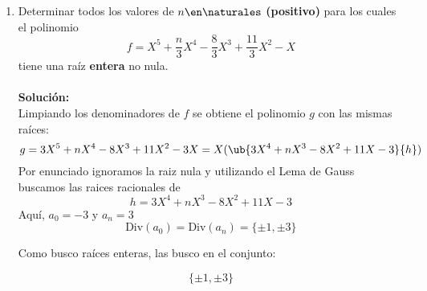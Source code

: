 \ejercicio
\begin{enumerate}[label=\alph*)]
\item
Determinar todos los valores de $n\en\naturales$ \textbf{(positivo)} para los cuales el polinomio
$$
f=X^5 + \frac{n}{3}X^4 - \frac{8}{3}X^3 + \frac{11}{3}X^2 - X
$$
tiene una raíz \textbf{entera} no nula. 
\\
\\
\textbf{Solución:}
\\
Limpiando los denominadores de $f$ se obtiene el polinomio $g$ con las mismas raíces:
$$
g=3X^5 + nX^4 - 8X^3 + 11X^2 - 3X= X(\ub{3X^4 + nX^3 - 8X^2 + 11X - 3}{h})
$$
Por enunciado ignoramos la raiz nula y utilizando el Lema de Gauss buscamos las raices racionales de
$$
h=3X^4 + nX^3 - 8X^2 + 11X - 3
$$
Aquí, $a_0=-3$ y $a_n=3$
\\
$$
\text{Div}(a_0)=\text{Div}(a_n)=\{\pm1,\pm3\}
$$

Como busco raíces enteras, las busco en el conjunto:

$$
\{ \pm1,\pm3 \}
$$


\end{enumerate}
